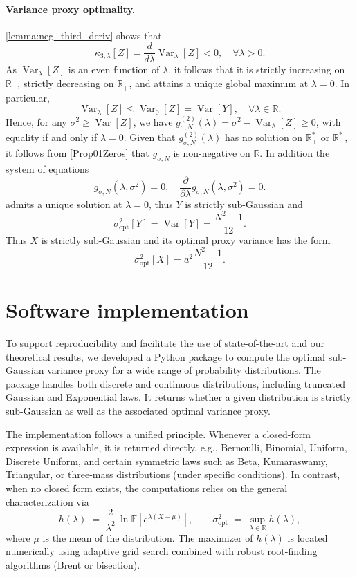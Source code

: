 \documentclass[a4paper, 10pt]{article}
\newcommand{\beq}{\begin{equation}}
\newcommand{\eeq}{\end{equation}}
\theoremstyle{definition}
\begin{document}
\paragraph{Variance proxy optimality.}
\autoref{lemma:neg_third_deriv} shows that
\[
\kappa_{3,\lambda}[Z] = \frac{d}{d\lambda}\operatorname{Var}_{\lambda}[Z] < 0, \quad \forall \lambda > 0.
\]
As \( \operatorname{Var}_{\lambda}[Z] \) is an even function of \( \lambda \), it follows that it is strictly increasing on \( \mathbb{R}_- \), strictly decreasing on \( \mathbb{R}_+ \), and attains a unique global maximum at \( \lambda = 0 \). In particular,
\[
\operatorname{Var}_{\lambda}[Z] \leq \operatorname{Var}_0[Z] = \operatorname{Var}[Y], \quad \forall \lambda \in \mathbb{R}.
\]
    Hence, for any \( \sigma^2 \geq \operatorname{Var}[Z] \), we have \( g_{\sigma,N}^{(2)}(\lambda) = \sigma^2 - \operatorname{Var}_\lambda[Z] \geq 0 \), with equality if and only if \( \lambda = 0 \). Given that \( g_{\sigma,N}^{(2)}(\lambda)\) has no solution on $\mathbb{R^*_+} \text{ or } \mathbb{R^*_-}$, it follows from \autoref{Prop01Zeros} that $g_{\sigma,N}$ is non-negative on $\mathbb{R} $. In addition the system of equations
\[
g_{\sigma,N}(\lambda,\sigma^2) = 0, \quad \frac{\partial}{\partial \lambda} g_{\sigma,N}(\lambda,\sigma^2) = 0 .
\]
admits a unique solution at \( \lambda = 0 \), thus \( Y \) is strictly sub-Gaussian and \beq 
\sigma^2_{\mathrm{opt}}[Y] = \operatorname{Var}[Y] = \frac{N^2 - 1}{12}. \eeq Thus \(X\) is strictly sub-Gaussian and its optimal proxy variance has the form \beq \sigma^2_{\mathrm{opt}}[X] = a^2 \frac{N^2 - 1}{12}. \eeq


\section{Software implementation}\label{sec:software}

To support reproducibility and facilitate the use of state-of-the-art and our theoretical results, 
we developed a Python package to compute the optimal sub-Gaussian variance proxy for a wide range of probability distributions. 
The package handles both discrete and continuous distributions, including truncated Gaussian and Exponential laws. 
It returns whether a given distribution is strictly sub-Gaussian as well as the associated optimal variance proxy. 

The implementation follows a unified principle. 
Whenever a closed-form expression is available, it is returned directly, e.g., Bernoulli, Binomial, Uniform, Discrete Uniform, and certain symmetric laws such as Beta, Kumaraswamy, Triangular, or  three-mass distributions (under specific conditions). 
In contrast, when no closed form exists, the computations relies on the general characterization via
\[
h(\lambda) \;=\; \frac{2}{\lambda^{2}} \, \ln \mathbb{E}\!\left[e^{\lambda(X-\mu)}\right],
\qquad 
\sigma^2_{\text{opt}} \;=\; \sup_{\lambda \in \mathbb{R}} h(\lambda),
\]
where $\mu$ is the mean of the distribution. 
The maximizer of $h(\lambda)$ is located numerically using adaptive grid search combined with robust root-finding algorithms (Brent or bisection). 
\end{document}
